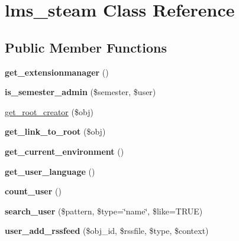 \hypertarget{classlms__steam}{
\section{lms\_\-steam Class Reference}
\label{classlms__steam}
}
\subsection*{Public Member Functions}
\begin{DoxyCompactItemize}
\item 
\hypertarget{classlms__steam_ac02819e5e9927527033e52009c9c504c}{
{\bfseries get\_\-extensionmanager} ()}
\label{classlms__steam_ac02819e5e9927527033e52009c9c504c}

\item 
\hypertarget{classlms__steam_a2ae03ad6c6ee7e210ad172baf5358c90}{
{\bfseries is\_\-semester\_\-admin} (\$semester, \$user)}
\label{classlms__steam_a2ae03ad6c6ee7e210ad172baf5358c90}

\item 
\hyperlink{classlms__steam_ad5c4a2f50ba85f9d359d3d172b2d8c58}{get\_\-root\_\-creator} (\$obj)
\item 
\hypertarget{classlms__steam_a4f05baa815bfe581edbf5a7d15de721d}{
{\bfseries get\_\-link\_\-to\_\-root} (\$obj)}
\label{classlms__steam_a4f05baa815bfe581edbf5a7d15de721d}

\item 
\hypertarget{classlms__steam_a228d45f8d547b6298bbc5a9039f16383}{
{\bfseries get\_\-current\_\-environment} ()}
\label{classlms__steam_a228d45f8d547b6298bbc5a9039f16383}

\item 
\hypertarget{classlms__steam_a875c305f4d949a6060fad8fa4c21eac8}{
{\bfseries get\_\-user\_\-language} ()}
\label{classlms__steam_a875c305f4d949a6060fad8fa4c21eac8}

\item 
\hypertarget{classlms__steam_a7d14450264dc0f070cf6218040718009}{
{\bfseries count\_\-user} ()}
\label{classlms__steam_a7d14450264dc0f070cf6218040718009}

\item 
\hypertarget{classlms__steam_ace51769230fd567a2ea6c2aaf7c58f0b}{
{\bfseries search\_\-user} (\$pattern, \$type=\char`\"{}name\char`\"{}, \$like=TRUE)}
\label{classlms__steam_ace51769230fd567a2ea6c2aaf7c58f0b}

\item 
\hypertarget{classlms__steam_a3e8f5008e4359f6f9328eef4ff50582b}{
{\bfseries user\_\-add\_\-rssfeed} (\$obj\_\-id, \$rssfile, \$type, \$context)}
\label{classlms__steam_a3e8f5008e4359f6f9328eef4ff50582b}


\end{DoxyCompactItemize}

